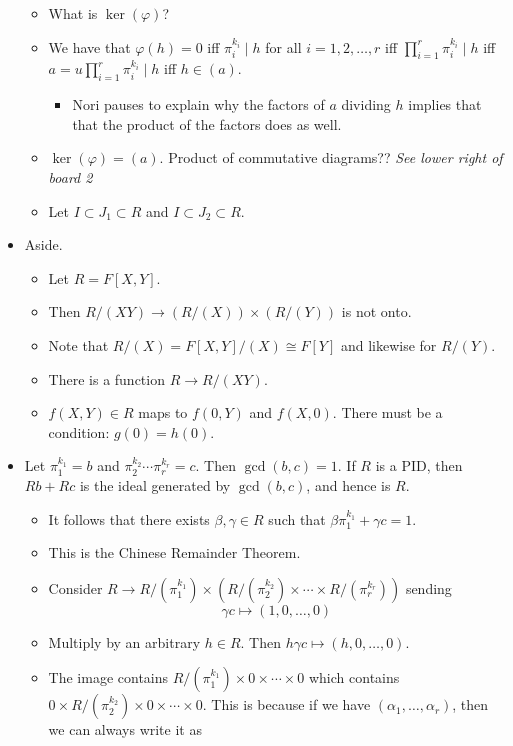 \documentclass[../notes.tex]{subfiles}
\begin{document}
\begin{itemize}
\begin{itemize}
        \item What is $\ker(\varphi)$?
        \item We have that $\varphi(h)=0$ iff $\pi_i^{k_i}\mid h$ for all $i=1,2,\dots,r$ iff $\prod_{i=1}^r\pi_i^{k_i}\mid h$ iff $a=u\prod_{i=1}^r\pi_i^{k_i}\mid h$ iff $h\in(a)$.
        \begin{itemize}
            \item Nori pauses to explain why the factors of $a$ dividing $h$ implies that that the product of the factors does as well.
        \end{itemize}
        \item $\ker(\varphi)=(a)$. Product of commutative diagrams?? \emph{See lower right of board 2}
        \item Let $I\subset J_1\subset R$ and $I\subset J_2\subset R$.
    \end{itemize}
    \item Aside.
    \begin{itemize}
        \item Let $R=F[X,Y]$.
        \item Then $R/(XY)\to(R/(X))\times(R/(Y))$ is not onto.
        \item Note that $R/(X)=F[X,Y]/(X)\cong F[Y]$ and likewise for $R/(Y)$.
        \item There is a function $R\to R/(XY)$.
        \item $f(X,Y)\in R$ maps to $f(0,Y)$ and $f(X,0)$. There must be a condition: $g(0)=h(0)$.
    \end{itemize}
    \item Let $\pi_1^{k_1}=b$ and $\pi_2^{k_2}\cdots\pi_r^{k_r}=c$. Then $\gcd(b,c)=1$. If $R$ is a PID, then $Rb+Rc$ is the ideal generated by $\gcd(b,c)$, and hence is $R$.
    \begin{itemize}
        \item It follows that there exists $\beta,\gamma\in R$ such that $\beta\pi_1^{k_1}+\gamma c=1$.
        \item This is the Chinese Remainder Theorem.
        \item Consider $R\to R/(\pi_1^{k_1})\times(R/(\pi_2^{k_2})\times\cdots\times R/(\pi_r^{k_r}))$ sending
        \begin{equation*}
            \gamma c\mapsto (1,0,\dots,0)
        \end{equation*}
        \item Multiply by an arbitrary $h\in R$. Then $h\gamma c\mapsto(h,0,\dots,0)$.
        \item The image contains $R/(\pi_1^{k_1})\times 0\times\cdots\times 0$ which contains $0\times R/(\pi_2^{k_2})\times 0\times\cdots\times 0$. This is because if we have $(\alpha_1,\dots,\alpha_r)$, then we can always write it as

\end{itemize}
\end{itemize}
\end{document}
